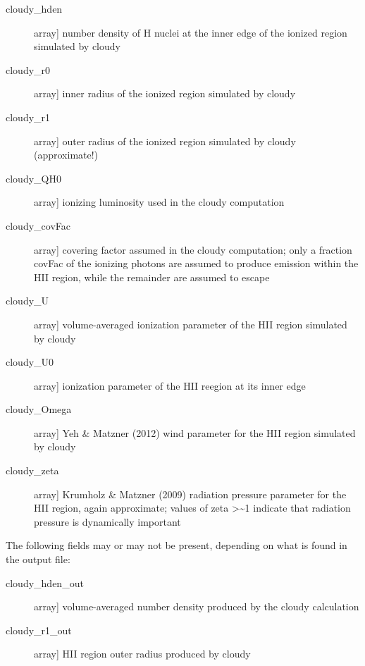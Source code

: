\documentclass[letterpaper,10pt,english]{sphinxmanual}
\begin{document}
\begin{fulllineitems}
\begin{description}
\begin{description}
\item[{cloudy\_hden}] \leavevmode{[}array{]}
number density of H nuclei at the inner edge of the ionized
region simulated by cloudy

\item[{cloudy\_r0}] \leavevmode{[}array{]}
inner radius of the ionized region simulated by cloudy

\item[{cloudy\_r1}] \leavevmode{[}array{]}
outer radius of the ionized region simulated by cloudy (approximate!)

\item[{cloudy\_QH0}] \leavevmode{[}array{]}
ionizing luminosity used in the cloudy computation

\item[{cloudy\_covFac}] \leavevmode{[}array{]}
covering factor assumed in the cloudy computation; only a
fraction covFac of the ionizing photons are assumed to
produce emission within the HII region, while the remainder
are assumed to escape

\item[{cloudy\_U}] \leavevmode{[}array{]}
volume-averaged ionization parameter of the HII region
simulated by cloudy

\item[{cloudy\_U0}] \leavevmode{[}array{]}
ionization parameter of the HII reegion at its inner edge

\item[{cloudy\_Omega}] \leavevmode{[}array{]}
Yeh \& Matzner (2012) wind parameter for the HII region
simulated by cloudy

\item[{cloudy\_zeta}] \leavevmode{[}array{]}
Krumholz \& Matzner (2009) radiation pressure parameter for
the HII region, again approximate; values of zeta \textgreater{}\textasciitilde{}1
indicate that radiation pressure is dynamically important

\end{description}

The following fields may or may not be present, depending on
what is found in the output file:
\begin{description}
\item[{cloudy\_hden\_out}] \leavevmode{[}array{]}
volume-averaged number density produced by the cloudy
calculation

\item[{cloudy\_r1\_out}] \leavevmode{[}array{]}
HII region outer radius produced by cloudy


\end{description}
\end{description}
\end{fulllineitems}
\end{document}
